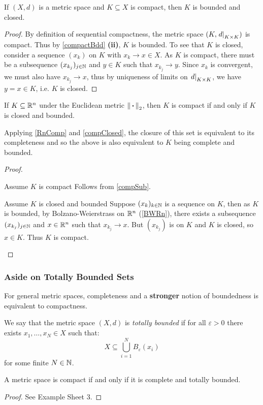 \documentclass[../main.tex]{subfiles}
\begin{document}
\begin{theorem}
  If $(X, d)$ is a metric space and $K \subseteq X$ is compact, then $K$ is bounded and closed. \label{compSub}
\end{theorem}
\begin{proof}
  By definition of sequential compactness, the metric space $(K, \left. d \right|_{K \times K})$ is compact.
  Thus by \cref{compactBdd} \textbf{(ii)}, $K$ is bounded.
  To see that $K$ is closed, consider a sequence $(x_k)$ on $K$ with $x_k \to x \in X$.
  As $K$ is compact, there must be a subsequence $(x_{k_j})_{j \in \mathbb{N}}$ and $y \in K$ such that $x_{k_{j}} \to y$.
  Since $x_k$ is convergent, we must also have $x_{k_j} \to x$, thus by uniqueness of limits on $\left. d \right|_{K \times K}$, we have $y = x \in K$, i.e. $K$ is closed.
\end{proof}
\begin{theorem}
  If $K \subseteq \mathbb{R}^{n}$ under the Euclidean metric $\left\lVert {\hspace{0.18em}\boldsymbol{\cdot}\hspace{0.18em}} \right\rVert_2$, then $K$ is compact if and only if $K$ is closed and bounded. \label{subsetRnComp}
\end{theorem}
\begin{remark}
  Applying \cref{RnComp} and \cref{compClosed}, the closure of this set is equivalent to its completeness and so the above is also equivalent to $K$ being complete and bounded.
\end{remark}
\begin{proof}
  \begin{proofdirection}{Assume $K$ is compact}
    Follows from \cref{compSub}.
  \end{proofdirection}
  \begin{proofdirection}{Assume $K$ is closed and bounded}
    Suppose $(x_k)_{k \in \mathbb{N}}$ is a sequence on $K$, then as $K$ is bounded, by Bolzano-Weierstrass on $\mathbb{R}^{n}$ (\cref{BWRn}), there exists a subsequence $(x_{k_j})_{j \in \mathbb{N}}$ and $x \in \mathbb{R}^{n}$ such that $x_{k_j} \to x$.
    But $(x_{k_j})$ is on $K$ and $K$ is closed, so $x \in K$.
    Thus $K$ is compact.
  \end{proofdirection}
\end{proof}
\subsubsection{Aside on Totally Bounded Sets}
\nonexaminable
For general metric spaces, completeness and a \textbf{stronger} notion of boundedness is equivalent to compactness.
\begin{definition}
  We say that the metric space $(X, d)$ is \textit{totally bounded} if for all $\varepsilon > 0$ there exists $x_1, \ldots, x_N \in X$ such that:
  \[
    X \subseteq \bigcup_{i = 1}^{N} B_\varepsilon(x_i)
  \]
  for some finite $N \in \mathbb{N}$.
\end{definition}
\begin{theorem}
  A metric space is compact if and only if it is complete and totally bounded.
\end{theorem}
\begin{proof}
  See Example Sheet 3.
\end{proof}
\end{document}
